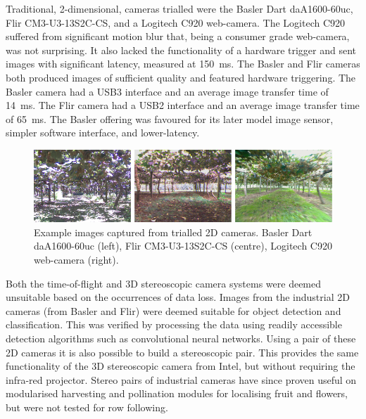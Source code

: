 \documentclass[preprint,authoryear,12pt]{elsarticle}
\begin{document}
        Traditional, 2-dimensional, cameras trialled were the Basler Dart daA1600-60uc, Flir CM3-U3-13S2C-CS, and a Logitech C920 web-camera.
        The Logitech C920 suffered from significant motion blur that, being a consumer grade web-camera, was not surprising.
        It also lacked the functionality of a hardware trigger and sent images with significant latency, measured at \SI{150}{\milli\second}.
        The Basler and Flir cameras both produced images of sufficient quality and featured hardware triggering.
        The Basler camera had a USB3 interface and an average image transfer time of \SI{14}{\milli\second}.
        The Flir camera had a USB2 interface and an average image transfer time of \SI{65}{\milli\second}.
        The Basler offering was favoured for its later model image sensor, simpler software interface, and lower-latency.

        \begin{figure}[htb]
            \centering
            \includegraphics[width=\linewidth]{imgs/camera_comparison/camera_comparison.pdf}
            \caption{
                Example images captured from trialled 2D cameras.
                Basler Dart daA1600-60uc (left), Flir CM3-U3-13S2C-CS (centre), Logitech C920 web-camera (right).
            }
            \label{fig:canopyDataCloud}
        \end{figure}

        Both the time-of-flight and 3D stereoscopic camera systems were deemed unsuitable based on the occurrences of data loss.
        Images from the industrial 2D cameras (from Basler and Flir) were deemed suitable for object detection and classification.
        This was verified by processing the data using readily accessible detection algorithms such as convolutional neural networks.
        Using a pair of these 2D cameras it is also possible to build a stereoscopic pair.
        This provides the same functionality of the 3D stereoscopic camera from Intel, but without requiring the infra-red projector.
        Stereo pairs of industrial cameras have since proven useful on modularised harvesting and pollination modules for localising fruit and flowers, but were not tested for row following.
\end{document}
